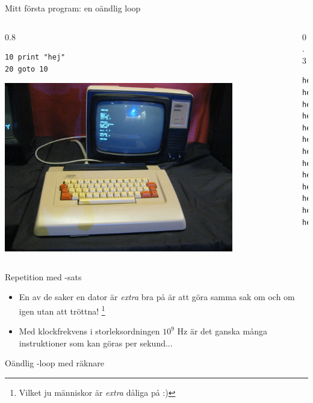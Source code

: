 \documentclass{lecturenotes}
\begin{document}
\begin{Slide}{Mitt första program: en oändlig loop}
\begin{columns}
\begin{column}{0.8\textwidth}
\begin{verbatim}
10 print "hej"
20 goto 10
\end{verbatim}
\includegraphics[width=0.8\textwidth]{img/abc80.jpg}
\end{column}
\begin{column}{0.3\textwidth}

\begin{verbatim}
hej
hej
hej
hej
hej
hej
hej
hej
hej
hej
hej
hej
hej
\end{verbatim}

\end{column}
\end{columns}
\end{Slide}

\begin{Slide}{Repetition med -sats}

\begin{itemize}
\item En av de saker en dator är \textit{extra} bra på är att göra samma sak om och om igen utan att tröttna! \footnote{Vilket ju människor är \textit{extra} dåliga på :)}
\item Med klockfrekvens i storleksordningen $10^9$ Hz är det ganska många instruktioner som kan göras per sekund...
\end{itemize}
\end{Slide}

\begin{Slide}{Oändlig -loop med räknare}

\end{Slide}
\end{document}
